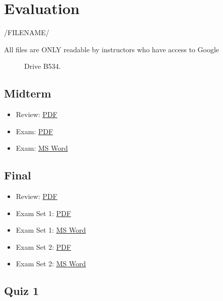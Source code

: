 \chapter{Evaluation}\label{evaluation}

/FILENAME/

\begin{description}
\item[All files are ONLY readable by instructors who have access to
Google]
Drive B534.
\end{description}

\section{Midterm}\label{midterm}

\begin{itemize}

\item
  Review:
  \href{https://drive.google.com/open?id=0B88HKpainTSfWGM1T1g1Tk1mYmM}{PDF}
\item
  Exam:
  \href{https://drive.google.com/open?id=0B88HKpainTSfS0syc1NEVDJjZDA}{PDF}
\item
  Exam:
  \href{https://drive.google.com/open?id=0B88HKpainTSfbXhROGptVi1iN1k}{MS
  Word}
\end{itemize}

\section{Final}\label{final}

\begin{itemize}

\item
  Review:
  \href{https://drive.google.com/open?id=0B88HKpainTSfRnV2WXZWbTNtLWc}{PDF}
\item
  Exam Set 1:
  \href{https://drive.google.com/open?id=0B88HKpainTSfWnVjVHpJTUFFYlU}{PDF}
\item
  Exam Set 1:
  \href{https://drive.google.com/open?id=0B88HKpainTSfNU1ldmItN3RIcUU}{MS
  Word}
\item
  Exam Set 2:
  \href{https://drive.google.com/open?id=0B88HKpainTSfTVZxMTZ4MC1sNFU}{PDF}
\item
  Exam Set 2:
  \href{https://drive.google.com/open?id=0B88HKpainTSfMGRzWDgtT1VDbEk}{MS
  Word}
\end{itemize}

\section{Quiz 1}\label{quiz-1}


